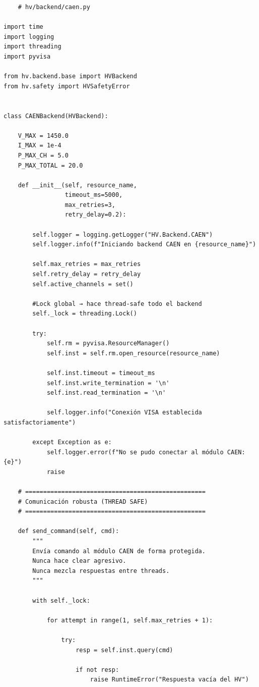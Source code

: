 \documentclass{article}
\begin{document}
\begin{lstlisting}
    # hv/backend/caen.py

import time
import logging
import threading
import pyvisa

from hv.backend.base import HVBackend
from hv.safety import HVSafetyError


class CAENBackend(HVBackend):

    V_MAX = 1450.0
    I_MAX = 1e-4
    P_MAX_CH = 5.0
    P_MAX_TOTAL = 20.0

    def __init__(self, resource_name,
                 timeout_ms=5000,
                 max_retries=3,
                 retry_delay=0.2):

        self.logger = logging.getLogger("HV.Backend.CAEN")
        self.logger.info(f"Iniciando backend CAEN en {resource_name}")

        self.max_retries = max_retries
        self.retry_delay = retry_delay
        self.active_channels = set()

        #Lock global → hace thread-safe todo el backend
        self._lock = threading.Lock()

        try:
            self.rm = pyvisa.ResourceManager()
            self.inst = self.rm.open_resource(resource_name)

            self.inst.timeout = timeout_ms
            self.inst.write_termination = '\n'
            self.inst.read_termination = '\n'

            self.logger.info("Conexión VISA establecida satisfactoriamente")

        except Exception as e:
            self.logger.error(f"No se pudo conectar al módulo CAEN: {e}")
            raise

    # ==================================================
    # Comunicación robusta (THREAD SAFE)
    # ==================================================

    def send_command(self, cmd):
        """
        Envía comando al módulo CAEN de forma protegida.
        Nunca hace clear agresivo.
        Nunca mezcla respuestas entre threads.
        """

        with self._lock:

            for attempt in range(1, self.max_retries + 1):

                try:
                    resp = self.inst.query(cmd)

                    if not resp:
                        raise RuntimeError("Respuesta vacía del HV")


\end{lstlisting}
\end{document}
